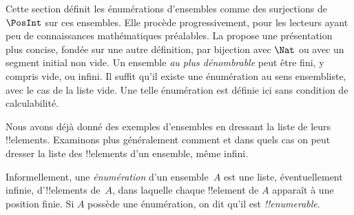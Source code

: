 \documentclass[../../../include/open-logic-section]{subfiles}
\begin{document}


\begin{editorial}
Cette section définit les énumérations d’ensembles comme des surjections
de $\PosInt$ sur ces ensembles. Elle procède progressivement, pour
les lecteurs ayant peu de connaissances mathématiques préalables.
La  propose une présentation plus concise, fondée
sur une autre définition, par bijection avec $\Nat$ ou avec un
segment initial non vide. Un ensemble \emph{au plus dénombrable} peut être fini,
y compris vide, ou infini. Il suffit qu’il existe une énumération
au sens ensembliste, avec le cas de la liste vide. Une telle
énumération est définie ici sans condition de
calculabilité.
\end{editorial}

\begin{explain}
Nous avons déjà donné des exemples d’ensembles en dressant la liste
de leurs !!{element}s. Examinons plus généralement comment et dans
quels cas on peut dresser la liste des !!{element}s d’un ensemble,
même infini.
\end{explain}

\begin{defn}
Informellement, une \emph{énumération} d’un ensemble~$A$ est une liste,
éventuellement infinie, d’!!{element}s de~$A$, dans laquelle chaque
!!{element} de $A$ apparaît à une position finie. Si $A$ possède
une énumération, on dit qu’il est \emph{!!{enumerable}}.
\end{defn}
\end{document}
